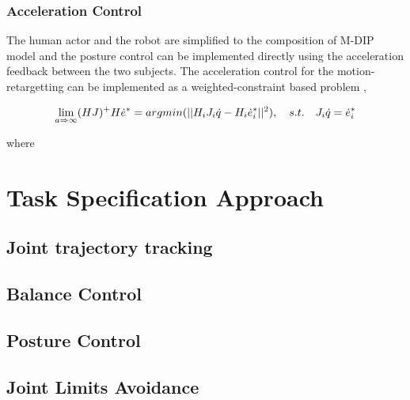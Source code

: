 \subsubsection{Acceleration Control}

The human actor and the robot are simplified to the composition of M-DIP model and the posture control can be implemented directly using the acceleration feedback between the 
two subjects. The acceleration control for the motion-retargetting can be implemented as a weighted-constraint based problem \cite{van1985method},

\begin{equation}
    \label{eq: MDIP-control}
    \lim_{a \Rightarrow \infty} (HJ)^+ H\dot{e}^* = argmin (||H_iJ_i\dot{q} - H_i\dot{e}^*_i||^2), \quad \mathnormal{s.t. \quad J_i\dot{q} = \dot{e}_i^*}
\end{equation}


where 
\section{Task Specification Approach}

\subsection{Joint trajectory tracking}
\subsection{Balance Control}
\subsection{Posture Control}
\subsection{Joint Limits Avoidance}

